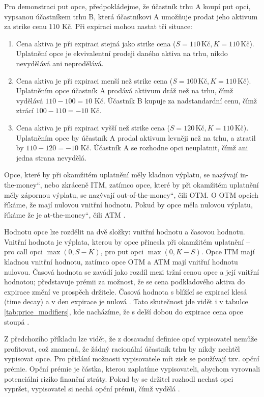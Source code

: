 \documentclass[male,czech,api_bc]{kitheses}
\newcommand{\UV}[1]{\quotedblbase#1\textquotedblleft}
\begin{document}
  Pro demonstraci put opce, předpokládejme, že účastník trhu A koupí put opci, vypsanou účastníkem trhu B, která účastníkovi A umožňuje prodat jeho aktivum za strike cenu 110 Kč. Při expiraci mohou nastat tři situace:
  \begin{enumerate}
    \item Cena aktiva je při expiraci stejná jako strike cena ($S = 110 \, \text{Kč}, K = 110 \, \text{Kč}$). Uplatnění opce je ekvivalentní prodeji daného aktiva na trhu, nikdo nevydělává ani neprodělává.
    \item Cena aktiva je při expiraci menší než strike cena ($S = 100 \, \text{Kč}, K = 110 \, \text{Kč}$). Uplatněním opce účastník A prodává aktivum dráž než na trhu, čímž vydělává $110 - 100 = 10$ Kč. Účastník B kupuje za nadstandardní cenu, čímž ztrácí $100 - 110 = -10$ Kč. 
    \item Cena aktiva je při expiraci vyšší než strike cena ($S = 120 \, \text{Kč}, K = 110 \, \text{Kč}$). Uplatněním opce by účastník A prodal aktivum levněji než na trhu, a ztratil by $110 - 120 = -10$ Kč. Účastník A se rozhodne opci neuplatnit, čímž ani jedna strana nevydělá.
  \end{enumerate}

Opce, které by při okamžitém uplatnění měly kladnou výplatu, se nazývají \UV{in-the-money}, nebo zkráceně ITM, zatímco opce, které by při okamžitém uplatnění měly zápornou výplatu, se nazývají \UV{out-of-the-money}, čili OTM. O OTM opcích říkáme, že mají nulovou vnitřní hodnotu. Pokud by opce měla nulovou výplatu, říkáme že je \UV{at-the-money}, čili ATM \parencites[kapitola~2.3]{Wilmott2006}[s.~58-59]{McDonald2013}.

  Hodnotu opce lze rozdělit na dvě složky: vnitřní hodnotu a časovou hodnotu. Vnitřní hodnota je výplata, kterou by opce přinesla při okamžitém uplatnění -- pro call opci $\max(0, S-K)$, pro put opci $\max(0, K-S)$. Opce ITM mají kladnou vnitřní hodnotu, zatímco opce OTM a ATM mají vnitřní hodnotu nulovou. Časová hodnota se zavádí jako rozdíl mezi tržní cenou opce a její vnitřní hodnotou; představuje prémii za možnost, že se cena podkladového aktiva do expirace změní ve prospěch držitele. Časová hodnota s blížící se expirací klesá (time decay) a v den expirace je nulová \parencites[s.~234]{Hull2021}. Tato skutečnost jde vidět i v tabulce \ref{tab:price_modifiers}, kde nacházíme, že s delší dobou do expirace cena opce stoupá \parencites[kapitola~2.3]{Wilmott2006}.

  Z předchozího příkladu lze vidět, že z dosavadní definice opcí vypisovatel nemůže profitovat, což znamená, že žádný racionální účastník trhu by nikdy nechtěl vypisovat opce. Pro přidání možnosti vypisovatele mít zisk se používají tzv. opční prémie.
  Opční prémie je částka, kterou zaplatíme vypisovateli, abychom vyrovnali potenciální riziko finanční ztráty. Pokud by se držitel rozhodl nechat opci vypršet, vypisovatel si nechá opční prémii, čímž vydělá \parencites[s.~9]{McDonald2013}.
\end{document}
